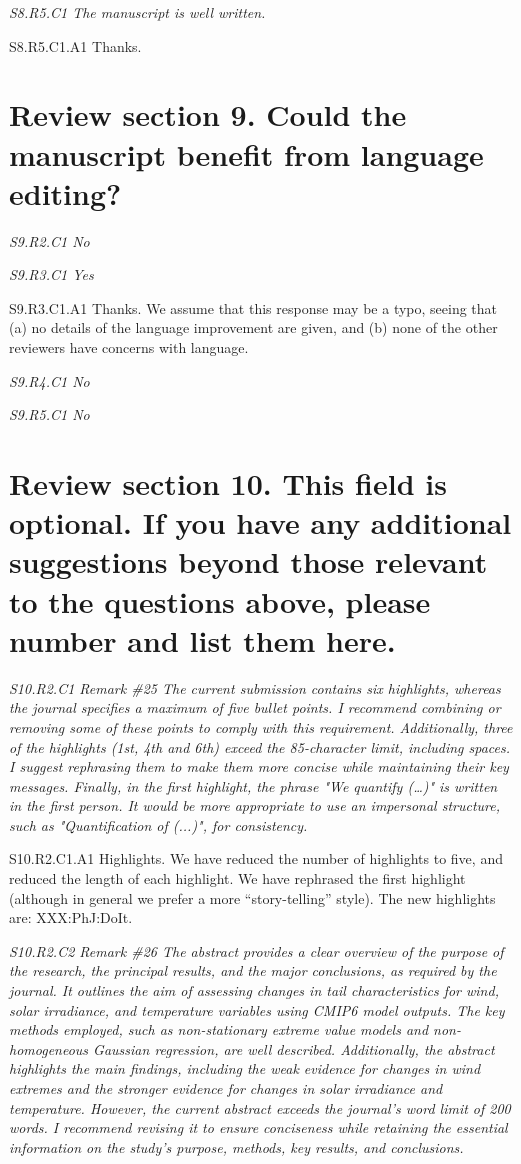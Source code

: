 \documentclass[a4paper,10pt]{article}
\begin{document}
	\emph{S8.R5.C1 The manuscript is well written.}

	S8.R5.C1.A1 Thanks.

	\section*{Review section 9. Could the manuscript benefit from language editing?}

	\emph{S9.R2.C1 No}

	\emph{S9.R3.C1 Yes}

	S9.R3.C1.A1 Thanks. We assume that this response may be a typo, seeing that (a) no details of the language improvement are given, and (b) none of the other reviewers have concerns with language.

	\emph{S9.R4.C1 No}

	\emph{S9.R5.C1 No}

	\section*{Review section 10. This field is optional. If you have any additional suggestions beyond those relevant to the questions above, please number and list them here.}

	\emph{S10.R2.C1 Remark \#25 The current submission contains six highlights, whereas the journal specifies a maximum of five bullet points. I recommend combining or removing some of these points to comply with this requirement. Additionally, three of the highlights (1st, 4th and 6th) exceed the 85-character limit, including spaces. I suggest rephrasing them to make them more concise while maintaining their key messages. Finally, in the first highlight, the phrase "We quantify (…)" is written in the first person. It would be more appropriate to use an impersonal structure, such as "Quantification of (...)", for consistency.}

	S10.R2.C1.A1 Highlights. We have reduced the number of highlights to five, and reduced the length of each highlight. We have rephrased the first highlight (although in general we prefer a more ``story-telling'' style). The new highlights are: XXX:PhJ:DoIt.

	\emph{S10.R2.C2 Remark \#26 The abstract provides a clear overview of the purpose of the research, the principal results, and the major conclusions, as required by the journal. It outlines the aim of assessing changes in tail characteristics for wind, solar irradiance, and temperature variables using CMIP6 model outputs. The key methods employed, such as non-stationary extreme value models and non-homogeneous Gaussian regression, are well described. Additionally, the abstract highlights the main findings, including the weak evidence for changes in wind extremes and the stronger evidence for changes in solar irradiance and temperature. However, the current abstract exceeds the journal's word limit of 200 words. I recommend revising it to ensure conciseness while retaining the essential information on the study's purpose, methods, key results, and conclusions.}
	
\end{document}

